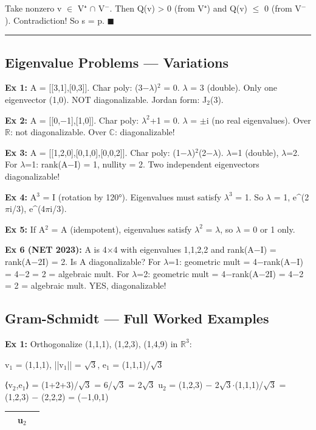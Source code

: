 \documentclass[12pt,a4paper,openany]{book}
\begin{document}
{{Take nonzero v $\in$ V⁺ $\cap$ V$^{-}$. Then Q(v) > 0 (from V⁺) and Q(v) $\leq$ 0 (from V$^{-}$). Contradiction! So s = p. $\blacksquare$

\bigskip\noindent\rule{\textwidth}{0.4pt}\bigskip


\subsection{Eigenvalue Problems — Variations}

\textbf{Ex 1:} A = [[3,1],[0,3]]. Char poly: (3−$\lambda$)$^2$ = 0. $\lambda$ = 3 (double). Only one eigenvector (1,0). NOT diagonalizable. Jordan form: J$_2$(3).

\textbf{Ex 2:} A = [[0,−1],[1,0]]. Char poly: $\lambda^2$+1 = 0. $\lambda$ = $\pm$i (no real eigenvalues). Over $\mathbb{R}$: not diagonalizable. Over $\mathbb{C}$: diagonalizable!

\textbf{Ex 3:} A = [[1,2,0],[0,1,0],[0,0,2]]. Char poly: (1−$\lambda$)$^2$(2−$\lambda$). $\lambda$=1 (double), $\lambda$=2. For $\lambda$=1: rank(A−I) = 1, nullity = 2. Two independent eigenvectors  diagonalizable!

\textbf{Ex 4:} A$^3$ = I (rotation by 120°). Eigenvalues must satisfy $\lambda^3$ = 1. So $\lambda$ = 1, e^(2$\pi$i/3), e^(4$\pi$i/3).

\textbf{Ex 5:} If A$^2$ = A (idempotent), eigenvalues satisfy $\lambda^2$ = $\lambda$, so $\lambda$ = 0 or 1 only.

\textbf{Ex 6 (NET 2023):} A is 4$\times$4 with eigenvalues 1,1,2,2 and rank(A−I) = rank(A−2I) = 2. Is A diagonalizable?
For $\lambda$=1: geometric mult = 4−rank(A−I) = 4−2 = 2 = algebraic mult. 
For $\lambda$=2: geometric mult = 4−rank(A−2I) = 4−2 = 2 = algebraic mult. 
YES, diagonalizable!

\subsection{Gram-Schmidt — Full Worked Examples}

\textbf{Ex 1:} Orthogonalize {(1,1,1), (1,2,3), (1,4,9)} in $\mathbb{R}^3$:

v$_1$ = (1,1,1), ||v$_1$|| = $\sqrt{3}$, e$_1$ = (1,1,1)/$\sqrt{3}$

⟨v$_2$,e$_1$⟩ = (1+2+3)/$\sqrt{3}$ = 6/$\sqrt{3}$ = 2$\sqrt{3}$
u$_2$ = (1,2,3) − 2$\sqrt{3}$$\cdot$(1,1,1)/$\sqrt{3}$ = (1,2,3) − (2,2,2) = (−1,0,1)
\begin{center}
\begin{tabular}{|l|l|l|}
\hline
\textbf{} & \textbf{u$_2$} & \textbf{} \\
\hline
\end{tabular}
\end{center}

}}
\end{document}
